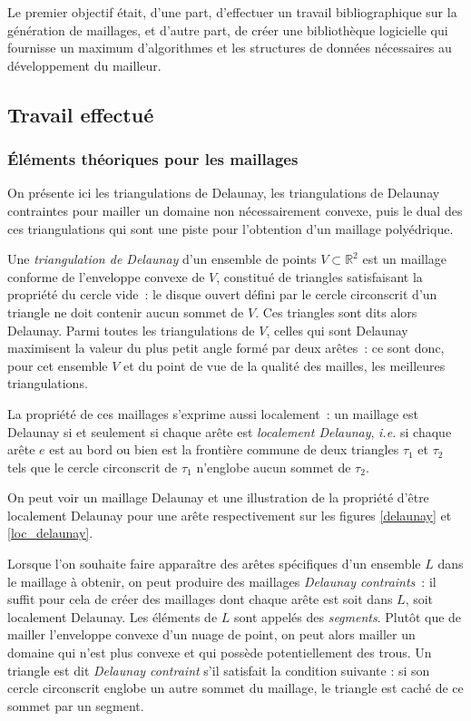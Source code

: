 \documentclass[12pt,a4paper]{report}
\begin{document}
Le premier objectif était, d'une part, d'effectuer un travail bibliographique sur la génération de maillages, et d'autre part, de créer une bibliothèque logicielle qui fournisse un maximum d'algorithmes et les structures de données nécessaires au développement du mailleur.

\subsection{Travail effectué}

\subsubsection{\'Eléments théoriques pour les maillages}

On présente ici les triangulations de Delaunay, les triangulations de Delaunay contraintes pour mailler un domaine non nécessairement convexe, puis le dual des ces triangulations qui sont une piste pour l'obtention d'un maillage polyédrique.
\vspace{1cm}

Une \emph{triangulation de Delaunay} d'un ensemble de points $V\subset\mathbb{R}^2$ est un maillage conforme de l'enveloppe convexe de $V$, constitué de triangles satisfaisant la propriété du cercle vide~: le disque ouvert défini par le cercle circonscrit d'un triangle ne doit contenir aucun sommet de $V$. Ces triangles sont dits alors Delaunay. Parmi toutes les triangulations de $V$, celles qui sont Delaunay maximisent la valeur du plus petit angle formé par deux arêtes~: ce sont donc, pour cet ensemble $V$ et du point de vue de la qualité des mailles, les \og meilleures \fg{} triangulations.

La propriété de ces maillages s'exprime aussi localement~: un maillage est Delaunay si et seulement si chaque arête est \emph{localement Delaunay}, \emph{i.e.} si chaque arête $e$ est au bord ou bien est la frontière commune de deux triangles $\tau_1$ et $\tau_2$ tels que le cercle circonscrit de $\tau_1$ n'englobe aucun sommet de $\tau_2$.

On peut voir un maillage Delaunay et une illustration de la propriété d'être localement Delaunay pour une arête respectivement sur les figures \ref{delaunay} et \ref{loc_delaunay}.

Lorsque l'on souhaite faire apparaître des arêtes spécifiques d'un ensemble $L$ dans le maillage à obtenir, on peut produire des maillages \emph{Delaunay contraints}~: il suffit pour cela de créer des maillages dont chaque arête est soit dans $L$, soit localement Delaunay. Les éléments de $L$ sont appelés des \emph{segments}. Plutôt que de mailler l'enveloppe convexe d'un nuage de point, on peut alors mailler un domaine qui n'est plus convexe et qui possède potentiellement des trous.
Un triangle est dit \emph{Delaunay contraint} s'il satisfait la condition suivante : si son cercle circonscrit englobe un autre sommet du maillage, le triangle est \og caché \fg{} de ce sommet par un segment.
\vspace{1cm}
\end{document}

